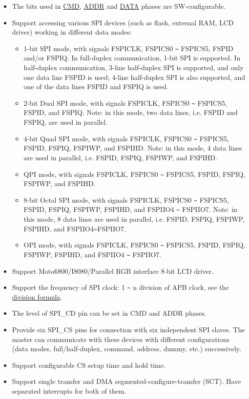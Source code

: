 \documentclass[main\_\_EN.tex]{subfiles}
\begin{document}
\begin{itemize}
    \item The bits used in \hyperref[phase:cmd]{CMD}, \hyperref[phase:addr]{ADDR} and \hyperref[phase:data]{DATA} phases are SW-configurable.
    \item Support accessing various SPI devices (such as flash, external RAM, LCD driver) working in different data modes:
    \begin{itemize}

      \item 1-bit SPI mode, with signals FSPICLK, FSPICS0 \verb+~+ FSPICS5, FSPID and/or FSPIQ. In full-duplex communication, 1-bit SPI is supported. In half-duplex communication, 3-line half-duplex SPI is supported, and only one data line FSPID is used; 4-line half-duplex SPI is also supported, and one of the data lines FSPID and FSPIQ is used.

      \item 2-bit Dual SPI mode, with signals FSPICLK, FSPICS0 \verb+~+ FSPICS5, FSPID, and FSPIQ. Note: in this mode, two data lines, i.e. FSPID and FSPIQ, are used in parallel.

      \item 4-bit Quad SPI mode, with signals FSPICLK, FSPICS0 \verb+~+ FSPICS5, FSPID, FSPIQ, FSPIWP, and FSPIHD. Note: in this mode, 4 data lines are used in parallel, i.e. FSPID, FSPIQ, FSPIWP, and FSPIHD.

      \item QPI mode, with signals FSPICLK, FSPICS0 \verb+~+ FSPICS5, FSPID, FSPIQ, FSPIWP, and FSPIHD.

      \item 8-bit Octal SPI mode, with signals FSPICLK, FSPICS0 \verb+~+ FSPICS5, FSPID, FSPIQ, FSPIWP, FSPIHD, and FSPIIO4 \verb+~+ FSPIIO7. Note: in this mode, 8 data lines are used in parallel, i.e. FSPID, FSPIQ, FSPIWP, FSPIHD, and FSPIIO4\verb+~+FSPIIO7.

      \item OPI mode, with signals FSPICLK, FSPICS0 \verb+~+ FSPICS5, FSPID, FSPIQ, FSPIWP, FSPIHD, and FSPIIO4 \verb+~+ FSPIIO7.
    \end{itemize}

    \item Support Moto6800/I8080/Parallel RGB interface 8-bit LCD driver.
    \item Support the frequency of SPI clock: 1 \verb+~+ n division of APB clock, see the \hyperref[division-formula]{division formula}.
    \item The level of SPI\_CD pin can be set in CMD and ADDR phases.
    \item Provide six SPI\_CS pins for connection with six independent SPI slaves. The master can communicate with these devices with different configurations (data modes, full/half-duplex, command, address, dummy, etc.) successively.
    \item Support configurable CS setup time and hold time.
    \item Support single transfer and DMA segmented-configure-transfer (SCT). Have separated interrupts for both of them.
\end{itemize}
\end{document}
